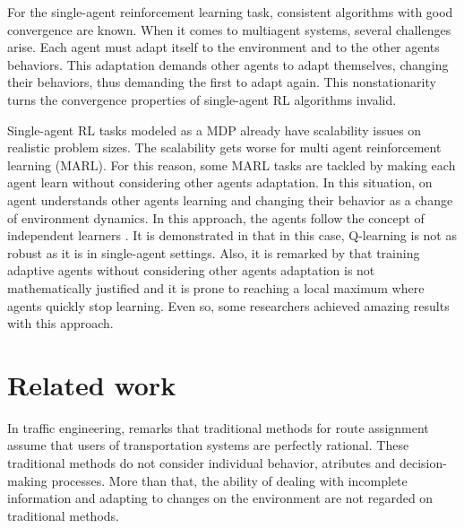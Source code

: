 \documentclass[12pt]{article}
\begin{document}
For the single-agent reinforcement learning task, consistent algorithms with good convergence are known. When it comes to multiagent systems, several challenges arise. Each agent must adapt itself to the environment and to the other agents behaviors. This adaptation demands other agents to adapt themselves, changing their behaviors, thus demanding the first to adapt again. This nonstationarity turns the convergence properties of single-agent RL algorithms invalid.


Single-agent RL tasks modeled as a MDP already have scalability issues on realistic problem sizes. The scalability gets worse for multi agent reinforcement learning (MARL). For this reason, some MARL tasks are tackled by making each agent learn without considering other agents adaptation. In this situation, on agent understands other agents learning and changing their behavior as a change of environment dynamics. In this approach, the agents follow the concept of independent learners \cite{Claus&Boutilier1998}. It is demonstrated in \cite{Claus&Boutilier1998} that in this case, Q-learning is not as robust as it is in single-agent settings. Also, it is remarked by \cite{Littman1994} that training adaptive agents without considering other agents adaptation is not mathematically justified and it is prone to reaching a local maximum where agents quickly stop learning. Even so, some researchers achieved amazing results with this approach.

\section{Related work}
\label{sec:related}

In traffic engineering, \cite{Bazzan&Kluegl2007} remarks that traditional methods for route assignment assume that users of transportation systems are perfectly rational. These traditional methods do not consider individual behavior, atributes and decision-making processes. More than that, the ability of dealing with incomplete information and adapting to changes on the environment are not regarded on traditional methods.
\end{document}
